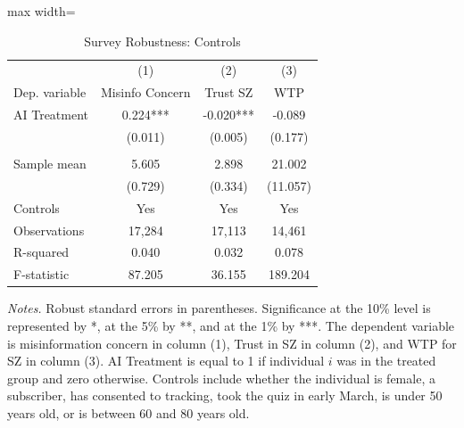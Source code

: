  \begin{table}[H]
 \centering 
 \caption{Survey Robustness: Controls} 
 \label{tab:resultssurvey_controls} 
 \begin{adjustbox}{max width=\textwidth} 
\def\sym#1{\ifmmode^{#1}\else\(^{#1}\)\fi}
\begin{tabular}{lccc} 
 \toprule
& (1) & (2) & (3)  \\
 Dep. variable & Misinfo Concern & Trust SZ & WTP \\ 
 \midrule 
AI Treatment    &    0.224***&   -0.020***&   -0.089   \\
                &  (0.011)   &  (0.005)   &  (0.177)   \\
& & &  \\
Sample mean&      5.605 &      2.898 &     21.002  \\
& (0.729) & (0.334) & (11.057)  \\
Controls& Yes & Yes & Yes  \\
 \midrule
Observations &     17,284 &     17,113 &     14,461  \\
R-squared&      0.040 &      0.032 &      0.078  \\
F-statistic &     87.205 &     36.155 &    189.204  \\
 \bottomrule
 \end{tabular}
 \end{adjustbox}
 \par
 \begin{minipage}{0.99\linewidth}
 \baselineskip9pt {\scriptsize \vspace{0.1cm} { \it Notes.} Robust standard errors in parentheses. Significance at the 10\% level is represented by *, at the 5\% by **, and at the 1\% by ***. The dependent variable is misinformation concern in column (1), Trust in SZ in column (2), and WTP for SZ in column (3). AI Treatment is equal to 1 if individual $i$ was in the treated group and zero otherwise. Controls include whether the individual is female, a subscriber, has consented to tracking, took the quiz in early March, is under 50 years old, or is between 60 and 80 years old.}
 \end{minipage}
 \end{table}
